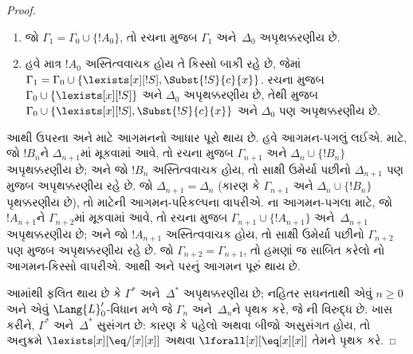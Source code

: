\begin{proof}
\begin{enumerate}
  તો $\Gamma_1=\Gamma_0$ અને ,  જ છે;
\item જો $\Gamma_1 = \Gamma_0 \cup\{!A_0\}$, તો રચના મુજબ
  $\Gamma_1$ અને~$\Delta_0$ અપૃથક્કરણીય છે.
\item હવે માત્ર $!A_0$ અસ્તિત્વવાચક હોય તે કિસ્સો બાકી રહે છે, જેમાં
  $\Gamma_1 = \Gamma_0 \cup \{ \lexists[x][!S], \Subst{!S}{c}{x}
  \}$. રચના મુજબ $\Gamma_0 \cup \{ \lexists[x][!S]\}$ અને
  $\Delta_0$ અપૃથક્કરણીય છે, તેથી  મુજબ
  $\Gamma_0 \cup \{ \lexists[x][!S], \Subst{!S}{c}{x} \}$ અને
  $\Delta_0$ પણ અપૃથક્કરણીય છે.
\end{enumerate}
આથી ઉપરના  અને  માટે આગમનનો આધાર પૂરો
થાય છે. હવે આગમન-પગલું લઈએ.  માટે, જો $!B_n$ને
$\Delta_{n+1}$માં મૂકવામાં આવે, તો રચના મુજબ $\Gamma_{n+1}$ અને
$\Delta_n\cup\{!B_n\}$ અપૃથક્કરણીય છે; અને જો $!B_n$ અસ્તિત્વવાચક
હોય, તો સાક્ષી ઉમેર્યા પછીનો $\Delta_{n+1}$ પણ
 મુજબ અપૃથક્કરણીય રહે છે. જો
$\Delta_{n+1}=\Delta_n$ (કારણ કે $\Gamma_{n+1}$ અને
$\Delta_n\cup\{!B_n\}$ પૃથક્કરણીય છે), તો  માટેની
આગમન-પરિકલ્પના વાપરીએ. ના આગમન-પગલા માટે, જો
$!A_{n+1}$ને $\Gamma_{n+2}$માં મૂકવામાં આવે, તો રચના મુજબ
$\Gamma_{n+1}\cup\{!A_{n+1}\}$ અને~$\Delta_{n+1}$ અપૃથક્કરણીય છે;
અને જો $!A_{n+1}$ અસ્તિત્વવાચક હોય, તો સાક્ષી ઉમેર્યા પછીનો
$\Gamma_{n+2}$ પણ  મુજબ અપૃથક્કરણીય રહે છે. જો
$\Gamma_{n+2}=\Gamma_{n+1}$, તો હમણાં જ સાબિત કરેલો
નો આગમન-કિસ્સો વાપરીએ. આથી  અને
 પરનું આગમન પૂરું થાય છે.

આમાંથી ફલિત થાય છે કે $\Gamma^*$ અને~$\Delta^*$ અપૃથક્કરણીય છે;
નહિતર સઘનતાથી એવું $n\ge0$ અને એવું $\Lang{L}'_0$-વિધાન મળે જે
$\Gamma_n$ અને~$\Delta_n$ને પૃથક કરે, જે ની વિરુદ્ધ
છે. ખાસ કરીને, $\Gamma^*$ અને~$\Delta^*$ સુસંગત છે: કારણ કે પહેલો
અથવા બીજો અસુસંગત હોય, તો અનુક્રમે $\lexists[x][\eq/[x][x]]$ અથવા
$\lforall[x][\eq[x][x]]$ તેમને પૃથક કરે.


\end{proof}
